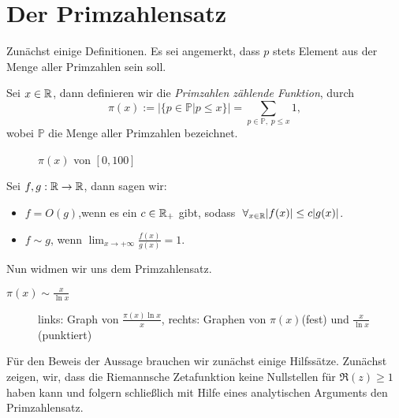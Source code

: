\documentclass{mywork}
\begin{document}
\section*{Der Primzahlensatz}
Zunächst einige Definitionen. Es sei angemerkt, dass $ p $ stets Element aus der Menge aller Primzahlen sein soll.

\begin{df}
Sei $ x\in \mathbb{R} $, dann definieren wir die \emph{Primzahlen zählende Funktion}, durch
\[
\pi(x):=|\{p\in \mathbb P| p \le x\}|=\sum_{p \in \mathbb P,\; p \le x} 1,
\]
wobei $ \mathbb P $ die Menge aller Primzahlen bezeichnet.
\end{df} 
\begin{figure}[H]
	\centering
	\newlength\figureheight 
	\newlength\figurewidth 
	\setlength\figureheight{6cm} 
	\setlength\figurewidth{10cm}
	
	\caption{$ \pi(x) $ von $ [0,100] $}
	\label{fig:pi}
\end{figure}

\begin{df}
Sei $ f,g: \mathbb{R}\to \mathbb{R} $, dann sagen wir:
\begin{itemize}
\item $ f=O(g)$,wenn es ein $ c\in \mathbb{R}_+ $ gibt, sodass $ \forall_{x\in \R} |f(x)|\le c|g(x)| $.
\item $ f\sim g $, wenn $ \lim_{x\to +\infty} \frac{f(x)}{g(x)}=1 $.
\end{itemize}
\end{df}
Nun widmen wir uns dem Primzahlensatz.
\begin{st}[Primzahlensatz]
$ \pi(x)\sim \frac{x}{\ln x} $
\end{st}
\begin{figure}[H]
	\centering
	\setlength\figureheight{3cm} 
	\setlength\figurewidth{5cm}
	\begin{minipage}{5cm}\end{minipage} \hspace{3cm} \begin{minipage}{5cm} \end{minipage}
	\caption{links: Graph von $\frac{\pi(x) \ln x}x$, rechts: Graphen von $ \pi(x) $(fest) und $ \frac{x}{\ln x} $(punktiert)}
	\label{fig:quotient}
\end{figure}

Für den Beweis der Aussage brauchen wir zunächst einige Hilfssätze. Zunächst zeigen, wir, dass die Riemannsche Zetafunktion keine Nullstellen für $ \Re(z)\ge 1 $ haben kann und folgern schließlich mit Hilfe eines analytischen Arguments den Primzahlensatz.
\end{document}
